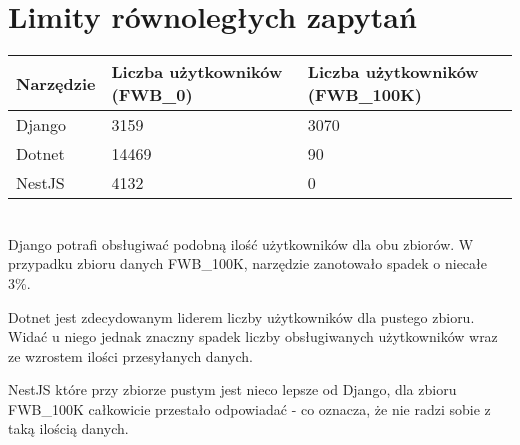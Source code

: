 \section{Limity równoległych zapytań}


\begin{tabular}{ | m{7em} | m{15em} | m{18em} | } 
    \hline
    Narzędzie & Liczba użytkowników (\textbf{FWB\_0}) & Liczba użytkowników (\textbf{FWB\_100K}) \\ 
    \hline
    Django & 3159 & 3070 \\ 
    \hline
    Dotnet & 14469 & 90 \\ 
    \hline
    NestJS & 4132 & 0 \\ 
    \hline
\end{tabular}
\phantom
\\

Django potrafi obsługiwać podobną ilość użytkowników dla obu zbiorów.
W przypadku zbioru danych FWB\_100K, narzędzie zanotowało spadek o niecałe 3\%.

Dotnet jest zdecydowanym liderem liczby użytkowników dla pustego zbioru. 
Widać u niego jednak znaczny spadek liczby obsługiwanych użytkowników wraz ze wzrostem ilości przesyłanych danych.

NestJS które przy zbiorze pustym jest nieco lepsze od Django, dla zbioru FWB\_100K całkowicie przestało odpowiadać - co oznacza, że nie radzi sobie z taką ilością danych.

